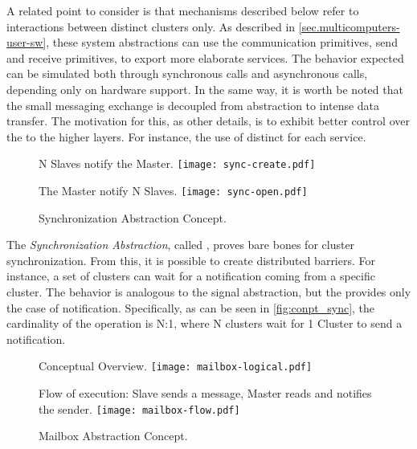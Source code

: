			A related point to consider is that mechanisms described below refer
			to interactions between distinct clusters only.
			As described in \autoref{sec.multicomputers-user-sw}, these system
			abstractions can use the communication primitives, \ie send and receive
			primitives, to export more elaborate services.
			The behavior expected can be simulated both through synchronous calls
			and asynchronous calls, depending only on hardware support.
			In the same way, it is worth be noted that the small messaging exchange
			is decoupled from abstraction to intense data transfer.
			The motivation for this, as other details, is to exhibit better control
			over the \qos to the higher layers.
			For instance, the use of distinct \nocs for each service.

			\label{sec.sync-abs}

				\begin{figure}[t]
					\centering%
					\caption{Synchronization Abstraction Concept.}%
					\label{fig:conpt_sync}%

						{N Slaves notify the Master.}%
						{\texttt{[image: sync-create.pdf]}}%

					\hfill

						{The Master notify N Slaves.}%
						{\texttt{[image: sync-open.pdf]}}%

				\end{figure}

				The \textit{Synchronization Abstraction}, called \sync, proves bare bones
				for cluster synchronization.
				From this, it is possible to create distributed barriers.
				For instance, a set of clusters can wait for a notification coming
				from a specific cluster.
				The behavior is analogous to the \posix signal abstraction, but the \sync
				provides only the case of notification.
				Specifically, as can be seen in \autoref{fig:conpt_sync}, the
				cardinality of the operation is N:1, where N clusters wait for 1 Cluster
				to send a notification.

			\label{sec.mailbox-abs}

				\begin{figure}[t]
					\centering%
					\caption{Mailbox Abstraction Concept.}%
					\label{fig:conpt_mailbox}%

						{Conceptual Overview.}%
						{\texttt{[image: mailbox-logical.pdf]}}%

					\hfill

						{Flow of execution: Slave sends a message, Master reads and notifies the sender.}%
						{\texttt{[image: mailbox-flow.pdf]}}%

				\end{figure}

